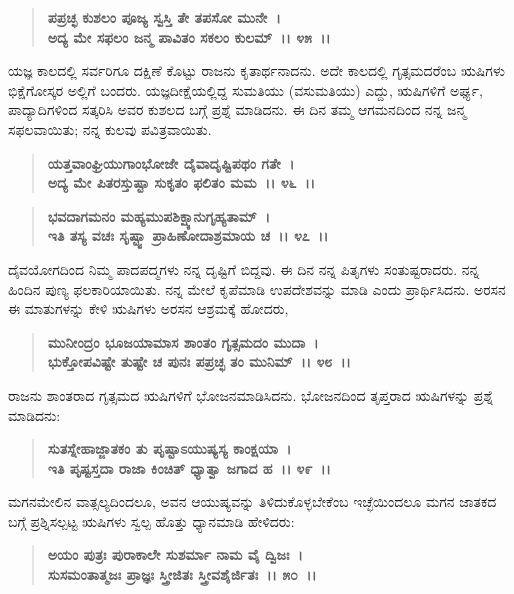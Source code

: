 \begin{verse}
\textbf{ಪಪ್ರಚ್ಛ ಕುಶಲಂ ಪೂಜ್ಯ ಸ್ವಸ್ತಿ ತೇ ತಪಸೋ ಮುನೇ~।}\\\textbf{ಅದ್ಯ ಮೇ ಸಫಲಂ ಜನ್ಮ ಪಾವಿತಂ ಸಕಲಂ ಕುಲಮ್~।। ೪೫~।।}
\end{verse}

ಯಜ್ಞ ಕಾಲದಲ್ಲಿ ಸರ್ವರಿಗೂ ದಕ್ಷಿಣೆ ಕೊಟ್ಟು ರಾಜನು ಕೃತಾರ್ಥನಾದನು. ಅದೇ ಕಾಲದಲ್ಲಿ ಗೃತ್ಸಮದರೆಂಬ ಋಷಿಗಳು ಭಿಕ್ಷೆಗೋಸ್ಕರ ಅಲ್ಲಿಗೆ ಬಂದರು. ಯಜ್ಞದೀಕ್ಷೆಯಲ್ಲಿದ್ದ ಸುಮತಿಯು (ವಸುಮತಿಯು) ಎದ್ದು, ಋಷಿಗಳಿಗೆ ಅರ್ಘ್ಯ, ಪಾದ್ಯಾದಿಗಳಿಂದ ಸತ್ಕರಿಸಿ ಅವರ ಕುಶಲದ ಬಗ್ಗೆ ಪ್ರಶ್ನೆ ಮಾಡಿದನು. ಈ ದಿನ ತಮ್ಮ ಆಗಮನದಿಂದ ನನ್ನ ಜನ್ಮ ಸಫಲವಾಯಿತು; ನನ್ನ ಕುಲವು ಪವಿತ್ರವಾಯಿತು.

\begin{verse}
\textbf{ಯತ್ತವಾಂಘ್ರಿಯುಗಾಂಭೋಜೇ ದೈವಾದೃಷ್ಟಿಪಥಂ ಗತೇ~।}\\\textbf{ಅದ್ಯ ಮೇ ಪಿತರಸ್ತುಷ್ಟಾ ಸುಕೃತಂ ಫಲಿತಂ ಮಮ~।। ೪೬~।। }
\end{verse}

\begin{verse}
\textbf{ಭವದಾಗಮನಂ ಮಹ್ಯಮುಪಶಿಕ್ಷ್ಯಾನುಗೃಹ್ಯತಾಮ್~।}\\\textbf{ಇತಿ ತಸ್ಯ ವಚಃ ಸೃಷ್ಟ್ವಾ ಪ್ರಾಹಿಣೋದಾಶ್ರಮಾಯ ಚ~।। ೪೭~।।}
\end{verse}

ದೈವಯೋಗದಿಂದ ನಿಮ್ಮ ಪಾದಪದ್ಮಗಳು ನನ್ನ ದೃಷ್ಟಿಗೆ ಬಿದ್ದವು. ಈ ದಿನ ನನ್ನ ಪಿತೃಗಳು ಸಂತುಷ್ಟರಾದರು. ನನ್ನ ಹಿಂದಿನ ಪುಣ್ಯ ಫಲಕಾರಿಯಾಯಿತು. ನನ್ನ ಮೇಲೆ ಕೃಪೆಮಾಡಿ ಉಪದೇಶವನ್ನು ಮಾಡಿ ಎಂದು ಪ್ರಾರ್ಥಿಸಿದನು. ಅರಸನ ಈ ಮಾತುಗಳನ್ನು ಕೇಳಿ ಋಷಿಗಳು ಅರಸನ ಆಶ್ರಮಕ್ಕೆ ಹೋದರು,

\begin{verse}
\textbf{ಮುನೀಂದ್ರಂ ಭೂಜಯಾಮಾಸ ಶಾಂತಂ ಗೃತ್ಸಮದಂ ಮುದಾ~।}\\\textbf{ಭುಕ್ತೋಪವಿಷ್ಟೇ ತುಷ್ಟೇ ಚ ಪುನಃ ಪಪ್ರಚ್ಛ ತಂ ಮುನಿಮ್~।। ೪೮~।।}
\end{verse}

ರಾಜನು ಶಾಂತರಾದ ಗೃತ್ಸಮದ ಋಷಿಗಳಿಗೆ ಭೋಜನಮಾಡಿಸಿದನು. ಭೋಜನದಿಂದ ತೃಪ್ತರಾದ ಋಷಿಗಳನ್ನು ಪ್ರಶ್ನೆ ಮಾಡಿದನು:

\begin{verse}
\textbf{ಸುತಸ್ನೇಹಾಜ್ಜಾತಕಂ ತು ಪೃಷ್ಟಾಽಯುಷ್ಯಸ್ಯ ಕಾಂಕ್ಷಯಾ~।}\\\textbf{ಇತಿ ಪೃಷ್ಟಸ್ತದಾ ರಾಜಾ ಕಿಂಚಿತ್ ಧ್ಯಾತ್ವಾ ಜಗಾದ ಹ~।। ೪೯~।।}
\end{verse}

ಮಗನಮೇಲಿನ ವಾತ್ಸಲ್ಯದಿಂದಲೂ, ಅವನ ಆಯುಷ್ಯವನ್ನು ತಿಳಿದುಕೊಳ್ಳಬೇಕೆಂಬ ಇಚ್ಛೆಯಿಂದಲೂ ಮಗನ ಜಾತಕದ ಬಗ್ಗೆ ಪ್ರಶ್ನಿಸಲ್ಪಟ್ಟ ಋಷಿಗಳು ಸ್ವಲ್ಪ ಹೊತ್ತು ಧ್ಯಾನಮಾಡಿ ಹೇಳಿದರು:

\begin{verse}
\textbf{ಅಯಂ ಪುತ್ರಃ ಪುರಾಕಾಲೇ ಸುಶರ್ಮಾ ನಾಮ ವೈ ದ್ವಿಜಃ~।}\\\textbf{ಸುಸಮಂತಾತ್ಮಜಃ ಪ್ರಾಜ್ಞಃ ಸ್ತ್ರೀಜಿತಃ ಸ್ತ್ರೀವಶೈರ್ಜಿತಃ~।। ೫೦~।।}
\end{verse}

